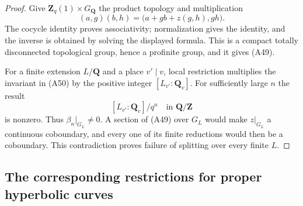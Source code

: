\documentclass[11pt,oneside]{article}
\begin{document}
\begin{proof}
Give $\mathbf Z_q(1)\times G_{\mathbf Q}$ the
product topology and multiplication
\[
 (a,g)(b,h)=\bigl(a+g b+z(g,h),gh\bigr).
                                                        \tag{A51}
\]
The cocycle identity proves associativity;
normalization gives the identity, and the
inverse is obtained by solving the displayed
formula. This is a compact totally disconnected
topological group, hence a profinite group,
and it gives (A49).

For a finite extension $L/\mathbf Q$ and a
place $v'\mid v$, local restriction multiplies
the invariant in (A50) by the positive integer
$[L_{v'}:\mathbf Q_v]$. For sufficiently large
$n$ the result
\[
                 [L_{v'}:\mathbf Q_v]/q^n
                         \quad\text{in }\mathbf Q/\mathbf Z
\]
is nonzero. Thus $\beta_n|_{G_L}\ne0$.
A section of (A49) over $G_L$ would make
$z|_{G_L}$ a continuous coboundary, and every
one of its finite reductions would then be
a coboundary. This contradiction proves
failure of splitting over every finite $L$.
\end{proof}

\subsection{The corresponding restrictions for proper hyperbolic curves}
\end{document}
